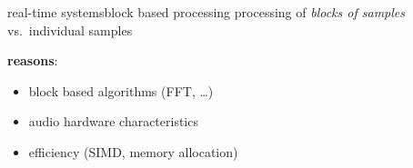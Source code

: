 	\begin{frame}{real-time systems}{block based processing}
		processing of \textit{blocks of samples} vs.\ individual samples
		
		\begin{figure}
			\centering
			
		\end{figure}
		\pause
		\vspace{-5mm}
		\textbf{reasons}:
		\begin{itemize}
			\item	block based algorithms (FFT, \ldots)
			\item	audio hardware characteristics
			\item	efficiency (SIMD, memory allocation)
		\end{itemize}
	\end{frame}
 		

